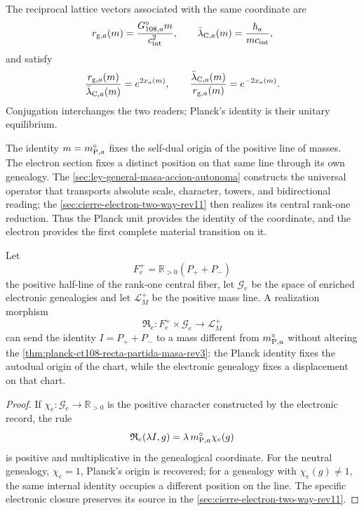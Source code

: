 The reciprocal lattice vectors associated with the same coordinate are
\[
 r_{{\rm g},a}(m)=\frac{G_{108,a}^{\circ}m}{c_{\rm int}^{2}},
 \qquad
 \bar\lambda_{{\rm C},a}(m)=\frac{\hbar_a}{mc_{\rm int}},
\]
and satisfy
\begin{equation}
 \frac{r_{{\rm g},a}(m)}{\bar\lambda_{{\rm C},a}(m)}
 =e^{2x_a(m)},
 \qquad
 \frac{\bar\lambda_{{\rm C},a}(m)}{r_{{\rm g},a}(m)}
 =e^{-2x_a(m)}.
 \label{eq:planck-ct108-lectores-exponenciales-rev3}
\end{equation}
Conjugation interchanges the two readers; Planck's identity is their unitary equilibrium.

\begin{exactbox}[title={Planck identity and electron closure}]
The identity \(m=m_{{\rm P},a}^{\circ}\) fixes the self-dual origin of the positive line of masses. The electron section fixes a distinct position on that same line through its own genealogy. The \cref{sec:ley-general-masa-accion-autonoma} constructs the universal operator that transports absolute scale, character, towers, and bidirectional reading; the \cref{sec:cierre-electron-two-way-rev11} then realizes its central rank-one reduction. Thus the Planck unit provides the identity of the coordinate, and the electron provides the first complete material transition on it.
\end{exactbox}

\begin{proposition}
\label{prop:planck-ct108-realizacion-centro-electron-rev3}
Let
\[
 F_e^+=\mathbb R_{>0}(P_++P_-)
\]
the positive half-line of the rank-one central fiber, let
\(\mathcal G_e\) be the space of enriched electronic
genealogies and let \(\mathcal L_M^+\) be the positive mass
line. A realization morphism
\[
 \mathfrak R_e:
 F_e^+\times\mathcal G_e\longrightarrow\mathcal L_M^+
\]
can send the identity \(I=P_++P_-\) to a mass different from
\(m_{{\rm P},a}^{\circ}\) without altering the
\cref{thm:planck-ct108-recta-partida-masa-rev3}: the Planck identity fixes the
autodual origin of the chart, while the electronic genealogy fixes a
displacement on that chart.
\end{proposition}

\begin{proof}
If \(\chi_e:\mathcal G_e\to\mathbb R_{>0}\) is the positive character constructed
by the electronic record, the rule
\[
 \mathfrak R_e(\lambda I,g)
 =\lambda\,m_{{\rm P},a}^{\circ}\chi_e(g)
\]
is positive and multiplicative in the genealogical coordinate. For the neutral
genealogy, \(\chi_e=1\), Planck's origin is recovered; for a genealogy with
\(\chi_e(g)\ne1\), the same internal identity occupies a different position on
the line. The specific electronic closure preserves its source in the
\cref{sec:cierre-electron-two-way-rev11}.
\end{proof}

